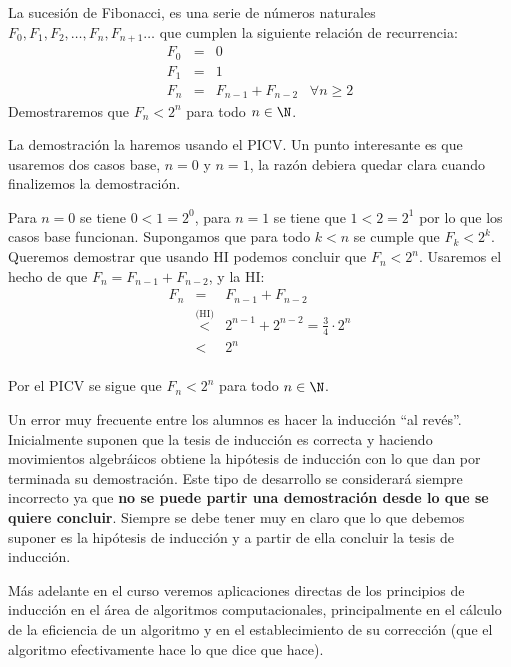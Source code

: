 \begin{ejemplo}
La sucesión de Fibonacci, es una serie de números naturales $F_0,F_1,F_2,\ldots,F_n,F_{n+1}\ldots$ que cumplen la siguiente relación de recurrencia:
\[
\begin{array}{rcl}
F_0 & = & 0 \\
F_1 & = & 1 \\
F_n & = & F_{n-1} + F_{n-2} \;\;\;\forall n\geq 2
\end{array}
\]
Demostraremos que $F_n<2^n$ para todo $n\in\N$.

\begin{demostracion}
La demostración la haremos usando el PICV.
Un punto interesante es que usaremos dos casos base, $n=0$ y $n=1$, la razón debiera quedar clara cuando finalizemos la demostración.
\begin{inducciondemo}
\BI Para $n=0$ se tiene $0<1=2^0$, para $n=1$ se tiene que $1<2=2^1$ por lo que los casos base funcionan.
\HI Supongamos que para todo $k<n$ se cumple que $F_k<2^k$.
\TI Queremos demostrar que usando HI podemos concluir que $F_n<2^n$.
Usaremos el hecho de que $F_n=F_{n-1}+F_{n-2}$, y la HI:
\[
\begin{array}{rcl}
F_n & = & F_{n-1} + F_{n-2} \\
 & \stackrel{\text{(HI)}}{<} & 2^{n-1}+2^{n-2} = \frac{3}{4}\cdot 2^n \\
 & < & 2^n \\
\end{array}
\]
\end{inducciondemo}
Por el PICV se sigue que $F_n<2^n$ para todo $n\in\N$.
\end{demostracion}
\end{ejemplo}

Un error muy frecuente entre los alumnos es hacer la inducción ``al revés''.
Inicialmente suponen que la tesis de inducción es correcta y haciendo movimientos algebráicos obtiene la hipótesis de inducción con lo que dan por terminada su demostración.
Este tipo de desarrollo se considerará siempre incorrecto ya que {\bf no se puede partir una demostración desde lo que se quiere concluir}.
Siempre se debe tener muy en claro que lo que debemos suponer es la hipótesis de inducción y a partir de ella concluir la tesis de inducción.

Más adelante en el curso veremos aplicaciones directas de los principios de inducción en el área de algoritmos computacionales, principalmente en el cálculo de la eficiencia de un algoritmo y en el establecimiento de su corrección (que el algoritmo efectivamente hace lo que dice que hace).

